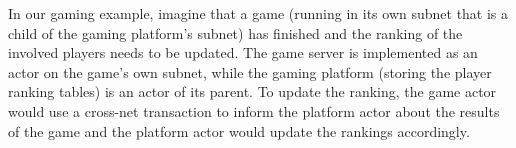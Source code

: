 \begin{example}

In our gaming example, imagine that a game (running in its own subnet that is a child of the gaming platform's subnet) has finished and the ranking of the involved players needs to be updated.
The game server is implemented as an actor on the game's own subnet, while the gaming platform (storing the player ranking tables) is an actor of its parent.
To update the ranking, the game actor would use a cross-net transaction to inform the platform actor about the results of the game and the platform actor would update the rankings accordingly.

\end{example}





